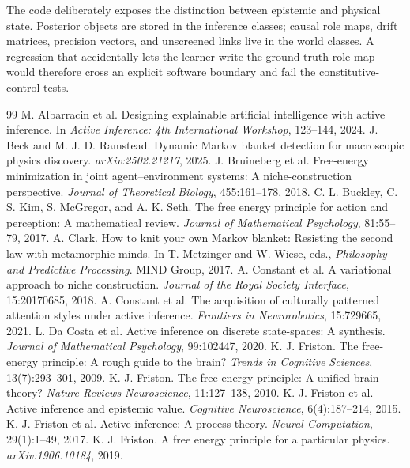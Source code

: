 \documentclass[11pt,a4paper]{article}
\numberwithin{equation}{section}
\begin{document}
The code deliberately exposes the distinction between epistemic and physical
state. Posterior objects are stored in the inference classes; causal role
maps, drift matrices, precision vectors, and unscreened links live in the
world classes. A regression that accidentally lets the learner write the
ground-truth role map would therefore cross an explicit software boundary and
fail the constitutive-control tests.

\begin{thebibliography}{99}
 M. Albarracin et al. Designing explainable artificial intelligence with active inference. In \emph{Active Inference: 4th International Workshop}, 123--144, 2024.
 J. Beck and M. J. D. Ramstead. Dynamic Markov blanket detection for macroscopic physics discovery. \emph{arXiv:2502.21217}, 2025.
 J. Bruineberg et al. Free-energy minimization in joint agent--environment systems: A niche-construction perspective. \emph{Journal of Theoretical Biology}, 455:161--178, 2018.
 C. L. Buckley, C. S. Kim, S. McGregor, and A. K. Seth. The free energy principle for action and perception: A mathematical review. \emph{Journal of Mathematical Psychology}, 81:55--79, 2017.
 A. Clark. How to knit your own Markov blanket: Resisting the second law with metamorphic minds. In T. Metzinger and W. Wiese, eds., \emph{Philosophy and Predictive Processing}. MIND Group, 2017.
 A. Constant et al. A variational approach to niche construction. \emph{Journal of the Royal Society Interface}, 15:20170685, 2018.
 A. Constant et al. The acquisition of culturally patterned attention styles under active inference. \emph{Frontiers in Neurorobotics}, 15:729665, 2021.
 L. Da Costa et al. Active inference on discrete state-spaces: A synthesis. \emph{Journal of Mathematical Psychology}, 99:102447, 2020.
 K. J. Friston. The free-energy principle: A rough guide to the brain? \emph{Trends in Cognitive Sciences}, 13(7):293--301, 2009.
 K. J. Friston. The free-energy principle: A unified brain theory? \emph{Nature Reviews Neuroscience}, 11:127--138, 2010.
 K. J. Friston et al. Active inference and epistemic value. \emph{Cognitive Neuroscience}, 6(4):187--214, 2015.
 K. J. Friston et al. Active inference: A process theory. \emph{Neural Computation}, 29(1):1--49, 2017.
 K. J. Friston. A free energy principle for a particular physics. \emph{arXiv:1906.10184}, 2019.

\end{thebibliography}
\end{document}
